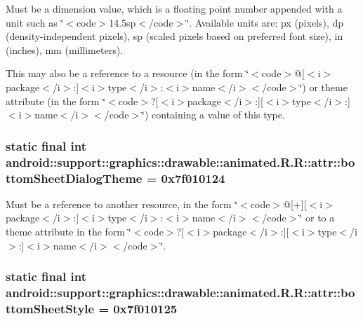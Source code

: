 Must be a dimension value, which is a floating point number appended with a unit such as \char`\"{}$<$code$>$14.5sp$<$/code$>$\char`\"{}. Available units are: px (pixels), dp (density-independent pixels), sp (scaled pixels based on preferred font size), in (inches), mm (millimeters). 

This may also be a reference to a resource (in the form \char`\"{}$<$code$>$@\mbox{[}$<$i$>$package$<$/i$>$:\mbox{]}$<$i$>$type$<$/i$>$:$<$i$>$name$<$/i$>$$<$/code$>$\char`\"{}) or theme attribute (in the form \char`\"{}$<$code$>$?\mbox{[}$<$i$>$package$<$/i$>$:\mbox{]}\mbox{[}$<$i$>$type$<$/i$>$:\mbox{]}$<$i$>$name$<$/i$>$$<$/code$>$\char`\"{}) containing a value of this type. \hypertarget{classandroid_1_1support_1_1graphics_1_1drawable_1_1animated_1_1_r_1_1attr_f7934eca76d64711285ccddc61d97a4b}{
\subsubsection[{bottomSheetDialogTheme}]{\setlength{\rightskip}{0pt plus 5cm}static final int android::support::graphics::drawable::animated.R.R::attr::bottomSheetDialogTheme = 0x7f010124}}
\label{classandroid_1_1support_1_1graphics_1_1drawable_1_1animated_1_1_r_1_1attr_f7934eca76d64711285ccddc61d97a4b}


Must be a reference to another resource, in the form \char`\"{}$<$code$>$@\mbox{[}+\mbox{]}\mbox{[}$<$i$>$package$<$/i$>$:\mbox{]}$<$i$>$type$<$/i$>$:$<$i$>$name$<$/i$>$$<$/code$>$\char`\"{} or to a theme attribute in the form \char`\"{}$<$code$>$?\mbox{[}$<$i$>$package$<$/i$>$:\mbox{]}\mbox{[}$<$i$>$type$<$/i$>$:\mbox{]}$<$i$>$name$<$/i$>$$<$/code$>$\char`\"{}. \hypertarget{classandroid_1_1support_1_1graphics_1_1drawable_1_1animated_1_1_r_1_1attr_6f4df8146d62d10f50dbbac0fd1aae3d}{
\subsubsection[{bottomSheetStyle}]{\setlength{\rightskip}{0pt plus 5cm}static final int android::support::graphics::drawable::animated.R.R::attr::bottomSheetStyle = 0x7f010125}}
\label{classandroid_1_1support_1_1graphics_1_1drawable_1_1animated_1_1_r_1_1attr_6f4df8146d62d10f50dbbac0fd1aae3d}


